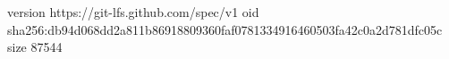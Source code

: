 version https://git-lfs.github.com/spec/v1
oid sha256:db94d068dd2a811b86918809360faf0781334916460503fa42c0a2d781dfc05c
size 87544
